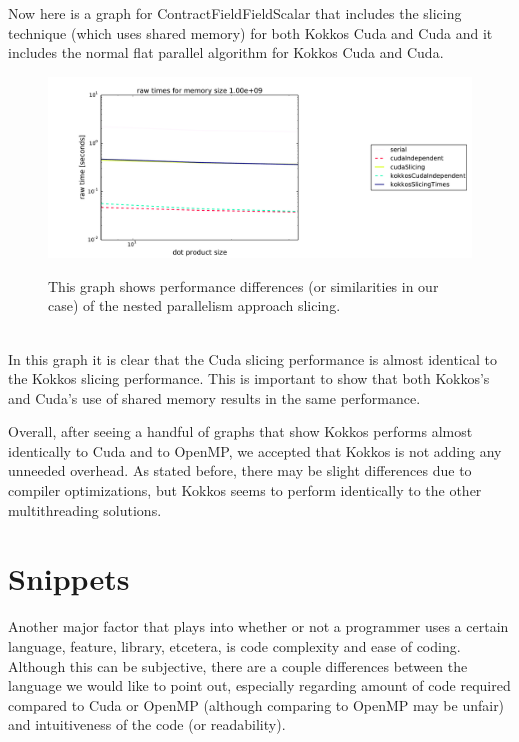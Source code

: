 Now here is a graph for ContractFieldFieldScalar that includes the slicing technique (which uses shared memory)
for both Kokkos Cuda and Cuda and it includes the normal flat parallel algorithm for Kokkos Cuda and Cuda. \\
\begin{figure}[!ht]
{\includegraphics[scale=.4]{CFFS_RawTimes_2d_largest_Comparison.pdf}}
\caption[ContractFieldFieldScalar Kokkos performance comparison]{This graph shows performance differences (or similarities in our case)
of the nested parallelism approach slicing.}
\label{fig:cffscomparison}
\end{figure} \\
In this graph it is clear that the Cuda slicing performance is almost identical
to the Kokkos slicing performance. This is important to show that both Kokkos's
and Cuda's use of shared memory results in the same performance. 

Overall, after seeing a handful of graphs that show Kokkos performs almost
identically to Cuda and to OpenMP, we accepted that Kokkos is not adding any
unneeded overhead. As stated before, there may be slight differences due to
compiler optimizations, but Kokkos seems to perform identically to the other
multithreading solutions.

\section{Snippets}
Another major factor that plays into whether or not a programmer uses a certain
language, feature, library, etcetera, is code complexity and ease of coding.
Although this can be subjective, there are a couple differences between the
language we would like to point out, especially regarding amount of code
required compared to Cuda or OpenMP (although comparing to OpenMP may be unfair)
and intuitiveness of the code (or readability). 

